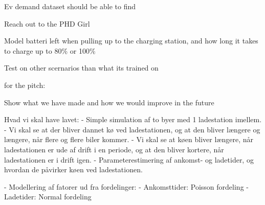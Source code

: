 Ev demand dataset should be able to find

Reach out to the PHD Girl

Model batteri left when pulling up to the charging station, and how long it takes to charge up to 80\% or 100\%

Test on other scernarios than what its trained on

for the pitch:

Show what we have made and how we would improve in the future



Hvad vi skal have lavet: 
- Simple simulation af to byer med 1 ladestation imellem. 
- Vi skal se at der bliver dannet kø ved ladestationen, og at den bliver længere og længere, når flere og flere biler kommer.
- Vi skal se at køen bliver længere, når ladestationen er ude af drift i en periode, og at den bliver kortere, når ladestationen er i drift igen.
- Parameterestimering af ankomst- og ladetider, og hvordan de påvirker køen ved ladestationen.


- Modellering af fatorer ud fra fordelinger: 
- Ankomsttider: Poisson fordeling
- Ladetider: Normal fordeling